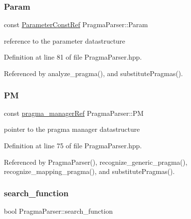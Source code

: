 \subsubsection{\texorpdfstring{Param}{Param}}
{\footnotesize\ttfamily const \hyperlink{Parameter_8hpp_a37841774a6fcb479b597fdf8955eb4ea}{Parameter\+Const\+Ref} Pragma\+Parser\+::\+Param\hspace{0.3cm}{\ttfamily [private]}}



reference to the parameter datastructure 



Definition at line 81 of file Pragma\+Parser.\+hpp.



Referenced by analyze\+\_\+pragma(), and substitute\+Pragmas().

\mbox{\label{classPragmaParser_a6972c78ee4e9f7bef88a70df69118660}} 
\subsubsection{\texorpdfstring{PM}{PM}}
{\footnotesize\ttfamily const \hyperlink{pragma__manager_8hpp_a6eb2deb9c5e77014dd1702c2971b1921}{pragma\+\_\+manager\+Ref} Pragma\+Parser\+::\+PM\hspace{0.3cm}{\ttfamily [private]}}



pointer to the pragma manager datastructure 



Definition at line 75 of file Pragma\+Parser.\+hpp.



Referenced by Pragma\+Parser(), recognize\+\_\+generic\+\_\+pragma(), recognize\+\_\+mapping\+\_\+pragma(), and substitute\+Pragmas().

\mbox{\label{classPragmaParser_a6cb7cee0dfb439e15f01bef38706dd3c}} 
\subsubsection{\texorpdfstring{search\+\_\+function}{search\_function}}
{\footnotesize\ttfamily bool Pragma\+Parser\+::search\+\_\+function\hspace{0.3cm}{\ttfamily [private]}}



